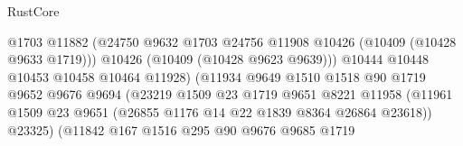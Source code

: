 \begin{lexlean}{RustCore}
\begin{coremodule}
                                                @1703
                                                @11882
                                                (@24750
                                                  @9632
                                                  @1703
                                                  @24756
                                                  @11908
                                                  @10426
                                                  (@10409 (@10428 @9633 @1719)))
                                                @10426
                                                (@10409 (@10428 @9623 @9639)))
                                              @10444
                                              @10448
                                              @10453
                                              @10458
                                              @10464
                                              @11928)
                                            (@11934
                                              @9649
                                              @1510
                                              @1518
                                              @90
                                              @1719
                                              @9652
                                              @9676
                                              @9694
                                              (@23219
                                                @1509
                                                @23
                                                @1719
                                                @9651
                                                @8221
                                                @11958
                                                (@11961
                                                  @1509
                                                  @23
                                                  @9651
                                                  (@26855 @1176 @14 @22 @1839 @8364 @26864 @23618))
                                                @23325)
                                              (@11842
                                                @167
                                                @1516
                                                @295
                                                @90
                                                @9676
                                                @9685
                                                @1719

\end{coremodule}
\end{lexlean}
